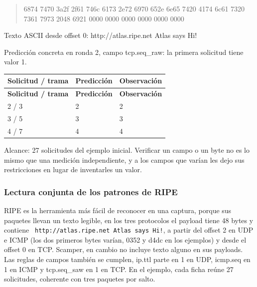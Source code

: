 \begin{quote}\ttfamily\footnotesize\raggedright 6874 7470 3a2f 2f61 746c 6173 2e72 6970 652e 6e65 7420 4174 6c61 7320 7361 7973 2048 6921 0000 0000 0000 0000 0000 0000\end{quote}
Texto ASCII desde offset 0: http://atlas.ripe.net Atlas says Hi!

Predicción concreta en ronda 2, campo tcp.seq\_\allowbreak{}raw: la primera solicitud tiene valor 1.

\begingroup
\fontsize{9}{11}\selectfont
\addtocounter{table}{-1}
\begin{longtable}{p{3.2cm}p{5.1cm}p{5.1cm}}
\toprule
\textbf{Solicitud / trama} & \textbf{Predicción} & \textbf{Observación} \\ \midrule
\endfirsthead
\toprule
\textbf{Solicitud / trama} & \textbf{Predicción} & \textbf{Observación} \\ \midrule
\endhead
2 / 3 & 2 & 2 \\
3 / 5 & 3 & 3 \\
4 / 7 & 4 & 4 \\
\bottomrule
\end{longtable}
\endgroup

Alcance: 27 solicitudes del ejemplo inicial. Verificar un campo o un byte no es lo mismo que una medición independiente, y a los campos que varían les dejo sus restricciones en lugar de inventarles un valor.

\subsubsection{Lectura conjunta de los patrones de RIPE}

RIPE es la herramienta más fácil de reconocer en una captura, porque sus paquetes llevan un texto legible, en los tres protocolos el payload tiene 48 bytes y contiene \verb| http://atlas.ripe.net Atlas says Hi!|, a partir  del offset 2 en UDP e ICMP (los dos primeros bytes varían, 0352 y d4dc en los ejemplos) y desde el offset 0 en TCP. Scamper, en cambio no incluye texto alguno en sus payloads. Las reglas de campos también se cumplen, ip.ttl parte en 1 en UDP, icmp.seq en 1 en ICMP y tcp.seq\_saw en 1 en TCP. En el ejemplo, cada ficha reúne 27 solicitudes, coherente con tres paquetes por salto.



